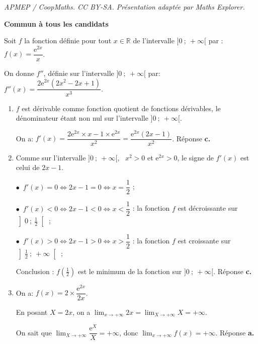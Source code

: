 \documentclass[10pt]{article}
\providecommand{\starredbullet}{\ensuremath{\bullet}}
\providecommand{\R}{\mathbb{R}}
\providecommand{\e}{{\mathrm{e}}}
\begin{document}
\noindent\textit{APMEP / CoopMaths. CC BY-SA. Présentation adaptée par Maths Explorer.}\par\medskip
\textbf{Commun à tous les candidats}

\medskip











Soit $f$ la fonction définie pour tout $x\in\R$ de l'intervalle $]0~;~ +\infty[$ par :
$ f(x) =\dfrac{\e^{2x}}{x}$.

On donne $f''$, définie sur l'intervalle $]0~;~ +\infty[$ par:
$f''(x)=\dfrac {2 \e^{2x} (2x^2-2x+1)}{x^3}$.

\smallskip

\begin{enumerate}
\item 
$f$ est dérivable comme fonction quotient de fonctions dérivables, le dénominateur étant non nul sur l'intervalle $]0~;~+\infty[$.

On a: $f'(x) = \dfrac{2\e^{2x} \times x - 1 \times \e^{2x}}{x^2} = \dfrac{\e^{2x}(2x - 1)}{x^2}$. \hfill{}Réponse \textbf{c.}





\item Comme sur l'intervalle $]0~;~+\infty[$, \, $x^2 > 0$ et $\e^{2x} > 0$, le signe de $f'(x)$ est celui de $2x - 1$.

\starredbullet~$f'(x)  = 0 \iff 2x - 1 = 0 \iff x = \dfrac{1}{2}$ ;

\starredbullet~$f'(x)  < 0 \iff 2x - 1 < 0 \iff x < \dfrac{1}{2}$ : la fonction $f$ est décroissante sur $\left]0~;~\frac{1}{2}\right[$ ;

\starredbullet~$f'(x)  > 0 \iff 2x - 1 > 0 \iff x > \dfrac{1}{2}$ : la fonction $f$ est croissante sur $\left]\frac{1}{2}~;~+ \infty\right[$ ;

Conclusion : $f\left(\frac{1}{2}\right)$ est le minimum de la fonction sur $]0~;~+ \infty[$.  
\hfill{}Réponse \textbf{c.}





\item   On a: $f(x) = 2 \times \dfrac{\e^{2x}}{2x}$.

En posant $X = 2x$, on a $\displaystyle\lim_{x \to + \infty} 2x = \displaystyle\lim_{X \to + \infty} X = + \infty$.

On sait que $\displaystyle\lim_{X \to + \infty} \dfrac{\e^X}{X} = + \infty$, donc $\displaystyle\lim_{x \to + \infty} f(x) = + \infty$. \hfill{}Réponse \textbf{a.}






\end{enumerate}
\end{document}

